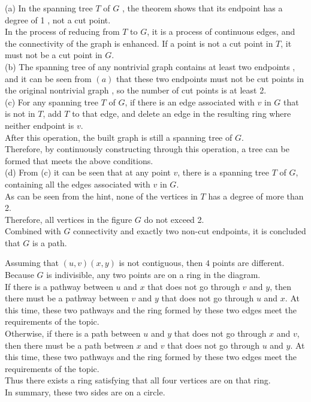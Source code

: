 \documentclass[a4paper, justified]{tufte-handout}
\begin{document}
\begin{solution}
  (a)
  In the spanning tree $T$ of $G$ , the theorem shows that its endpoint has a degree of 1 , not a cut point.\\
  In the process of reducing from $T$ to $G$, it is a process of continuous edges, and the connectivity of the graph is enhanced. If a point is not a cut point in $T$, it must not be a cut point in $G$. \\
  (b)
  The spanning tree of any nontrivial graph contains at least two endpoints , and it can be seen from $( a) $ that these two endpoints must not be cut points in the original nontrivial graph , so the number of cut points is at least 2. \\
  (c)
  For any spanning tree $T$ of $G$, if there is an edge associated with $v$ in $G$ that is not in $T$, add $T$ to that edge, and delete an edge in the resulting ring where neither endpoint is $v$. \\
  After this operation, the built graph is still a spanning tree of $G$. \\Therefore, by continuously constructing through this operation, a tree can be formed that meets the above conditions. \\
  (d)
  From (c) it can be seen that at any point $v$, there is a spanning tree $T$ of $G$, containing all the edges associated with $v$ in $G$.\\
  As can be seen from the hint, none of the vertices in $T$ has a degree of more than 2. \\
  Therefore, all vertices in the figure $G$ do not exceed 2. \\
  Combined with $G$ connectivity and exactly two non-cut endpoints, it is concluded that $G$ is a path.

\end{solution}

\begin{problem}[CZ 5.10]
\end{problem}

\begin{solution}
  Assuming that $(u,v)(x,y)$ is not contiguous, then $4$ points are different. Because $G$ is indivisible, any two points are on a ring in the diagram. \\
  If there is a pathway between $u$ and $x$ that does not go through $v$ and $y$, then there must be a pathway between $v$ and $y$ that does not go through $u$ and $x$. At this time, these two pathways and the ring formed by these two edges meet the requirements of the topic. \\
  Otherwise, if there is a path between $u$ and $y$ that does not go through $x$ and $v$, then there must be a path between $x$ and $v$ that does not go through $u$ and $y$. At this time, these two pathways and the ring formed by these two edges meet the requirements of the topic. \\
  Thus there exists a ring satisfying that all four vertices are on that ring.\\
  In summary, these two sides are on a circle.
\end{solution}
\end{document}
